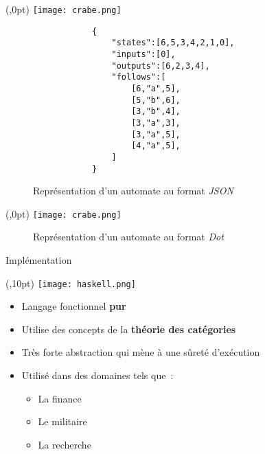 \documentclass[aspectratio=169,xcolor=dvipsnames]{beamer}
\begin{document}
\begin{frame}[fragile]
    \begin{textblock*}{20pt}(\textwidth-70pt,0pt)
        \texttt{[image: crabe.png]}
    \end{textblock*}
    \begin{figure}  
        \begin{verbatim}
            {
                "states":[6,5,3,4,2,1,0],
                "inputs":[0],
                "outputs":[6,2,3,4],
                "follows":[
                    [6,"a",5],
                    [5,"b",6],
                    [3,"b",4],
                    [3,"a",3],
                    [3,"a",5],
                    [4,"a",5],
                ]
            }
        \end{verbatim}
        \caption{
            Représentation d'un automate au format \textit{JSON} 
        }
    \end{figure}  
\end{frame}


\begin{frame}
    \begin{textblock*}{20pt}(\textwidth-70pt,0pt)
        \texttt{[image: crabe.png]}
    \end{textblock*}
    \begin{figure}
        
        \caption{
            Représentation d'un automate au format \textit{Dot} 
        }
    \end{figure}
\end{frame}



\begin{frame}{Implémentation}
    \begin{textblock*}{20pt}(\textwidth-50pt,10pt)
        \texttt{[image: haskell.png]}
    \end{textblock*}
    \begin{itemize}
        \item[\textbullet] Langage fonctionnel \textbf{pur}
        \item[\textbullet] Utilise des concepts de la 
        \textbf{théorie des catégories}
        \item[\textbullet] Très forte abstraction qui mène à une sûreté 
        d'exécution
        \item[\textbullet] Utilisé dans des domaines tels que~:
            \begin{itemize}
                \item[\textbullet] La finance
                \item[\textbullet] Le militaire
                \item[\textbullet] La recherche  
            \end{itemize} 
    \end{itemize}
\end{frame}
\end{document}
